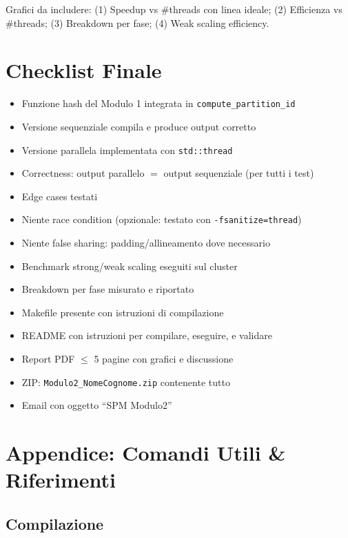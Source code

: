 \documentclass[11pt,a4paper]{article}
\begin{document}
Grafici da includere: (1) Speedup vs \#threads con linea ideale; (2) Efficienza vs \#threads; (3) Breakdown per fase; (4) Weak scaling efficiency.


\section{Checklist Finale}

\begin{itemize}[label=$\square$]
  \item Funzione hash del Modulo 1 integrata in \texttt{compute\_partition\_id}
  \item Versione sequenziale compila e produce output corretto
  \item Versione parallela implementata con \texttt{std::thread}
  \item Correctness: output parallelo $=$ output sequenziale (per tutti i test)
  \item Edge cases testati
  \item Niente race condition (opzionale: testato con \texttt{-fsanitize=thread})
  \item Niente false sharing: padding/allineamento dove necessario
  \item Benchmark strong/weak scaling eseguiti sul cluster
  \item Breakdown per fase misurato e riportato
  \item Makefile presente con istruzioni di compilazione
  \item README con istruzioni per compilare, eseguire, e validare
  \item Report PDF $\leq$ 5 pagine con grafici e discussione
  \item ZIP: \texttt{Modulo2\_NomeCognome.zip} contenente tutto
  \item Email con oggetto ``SPM Modulo2''
\end{itemize}


\section{Appendice: Comandi Utili \& Riferimenti}

\subsection{Compilazione}
\end{document}
